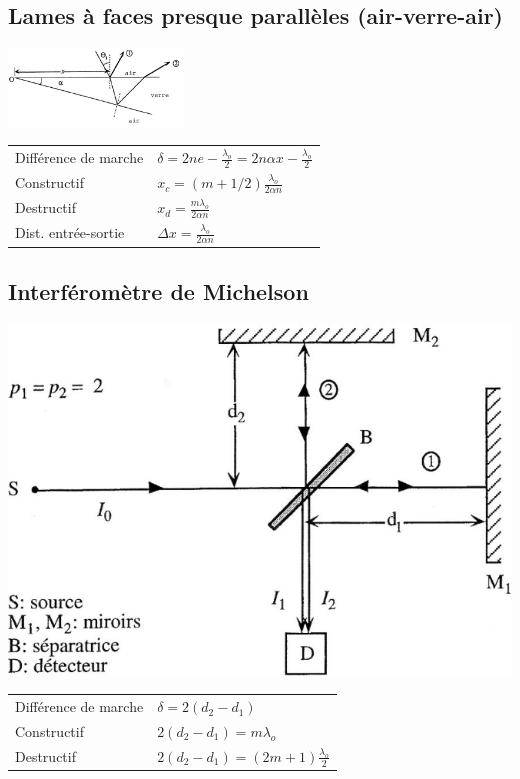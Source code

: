 \subsection{Lames à faces presque parallèles (air-verre-air)}
\begin{center}
    \includegraphics[width=0.35\textwidth]{fig/lames_presque_paralleles.PNG}    
\end{center}
\begin{tabular}{ll}
    Différence de marche & \(\delta=2ne-\frac{\lambda_o}{2}=2n\alpha x - \frac{\lambda_o}{2}\)\\[8pt]
    Constructif & \(x_c=(m+1/2)\frac{\lambda_o}{2\alpha n}\)\\[8pt]
    Destructif & \(x_d=\frac{m\lambda_o}{2\alpha n}\)\\[8pt]
    Dist. entrée-sortie & \(\Delta x = \frac{\lambda_o}{2\alpha n}\)
\end{tabular}


\subsection{Interféromètre de Michelson}
\begin{center}
    \includegraphics[width=.35\textwidth]{fig/michelson.png}
\end{center}
\begin{tabular}{ll}
    Différence de marche & \(\delta=2(d_2-d_1)\)\\
    Constructif & \(2(d_2-d_1)=m\lambda_o\) \\
    Destructif & \(2(d_2-d_1)=(2m+1)\frac{\lambda_o}{2}\)
\end{tabular}
